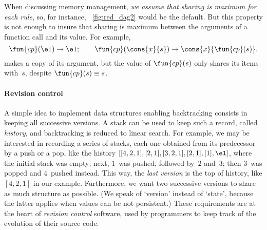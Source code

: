 When discussing memory management, \emph{we assume that sharing is
  maximum for each rule}, so, for instance, \fig~\vref{fig:red_dag2}
would be the default. But this property is not enough to insure that
sharing is maximum between the arguments of a function call and its
value. For example,
\begin{equation*}
\fun{cp}(\el) \rightarrow \el;\qquad
\fun{cp}(\cons{x}{s}) \rightarrow \cons{x}{\fun{cp}(s)}.
\end{equation*}
makes a copy of its argument, but the value of \(\fun{cp}(s)\) only
shares its items with~\(s\), despite \(\fun{cp}(s) \equiv s\).

\paragraph{Revision control}

A simple idea to implement data structures enabling backtracking
consists in keeping all successive
versions. A stack can be used to keep
such a record, called \emph{history}, and
backtracking is reduced to linear search. For
example, we may be interested in recording a series of stacks, each
one obtained from its predecessor by a push or a pop, like the history
\([[4,2,1],[2,1],[3,2,1],[2,1],[1],\el]\), where the initial stack was
empty; next, \(1\)~was pushed, followed by~\(2\) and~\(3\); then
\(3\)~was popped and \(4\)~pushed instead. This way, the \emph{last
version} is the top of history, like \([4,2,1]\) in our
example. Furthermore, we want two successive versions to share as much
structure as possible. (We speak of `version' instead of `state',
because the latter applies when values can be not persistent.) These
requirements are at the heart of \emph{revision control} software,
used by programmers to keep track of the evolution of their source
code.


